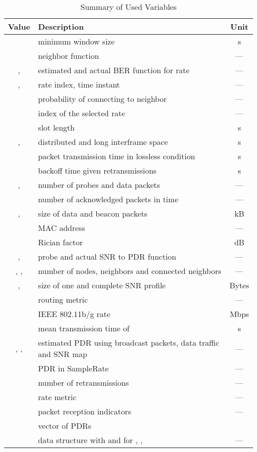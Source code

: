 \documentclass[11pt,draftclsnofoot,journal,onecolumn]{IEEEtran}
\begin{document}
\begin{table*}
\centering
\caption{Summary of Used Variables}
\label{variables}
\begin{tabular}{c|l|c}
  \hline
  Value & Description & Unit\\
  \hline\hline
   & minimum window size & s \\
   & neighbor function & --- \\
  ,  & estimated and actual BER function for rate  & --- \\
  ,  & rate index, time instant & --- \\
   & probability of connecting to neighbor & --- \\
   & index of the selected rate & --- \\
   & slot length & s\\
  ,  & distributed and long interframe space & s \\
   & packet transmission time in lossless condition & s \\
   & backoff time given retransmissions & s \\
  ,  & number of probes and data packets & --- \\
   & number of acknowledged packets in time  & --- \\
  ,  & size of data and beacon packets & kB \\
   & MAC address & --- \\
   & Rician factor & dB \\
  ,  & probe and actual SNR to PDR function & --- \\
  , ,  & number of nodes, neighbors and connected neighbors & --- \\
  ,  & size of one and complete SNR profile & Bytes \\
   & routing metric & --- \\
   & IEEE 802.11b/g rate  & Mbps\\
   & mean transmission time of  & s \\
  , ,  & estimated PDR using broadcast packets, data traffic and SNR map& --- \\
   & PDR in SampleRate & --- \\
   & number of retransmissions & --- \\
   & rate metric & --- \\
   & packet reception indicators & --- \\
   & vector of PDRs & \\
   & data structure with  and  for , ,  & --- \\

\end{tabular}
\end{table*}
\end{document}
